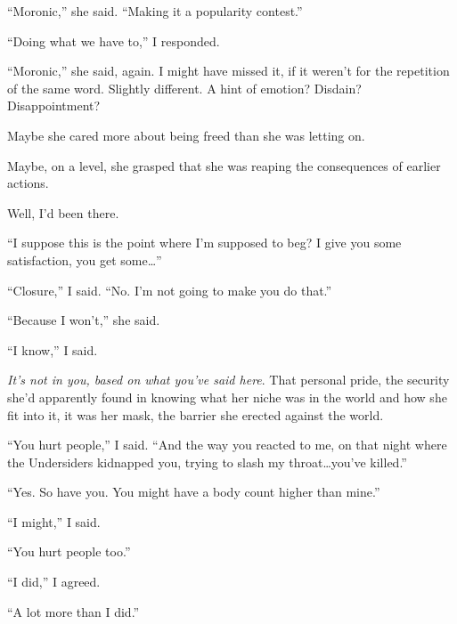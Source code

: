 ``Moronic,'' she said.  ``Making it a popularity contest.''



``Doing what we have to,'' I responded.



``Moronic,'' she said, again.  I might have missed it, if it weren't for the repetition of the same word.  Slightly different.  A hint of emotion?  Disdain?  Disappointment?



Maybe she cared more about being freed than she was letting on.



Maybe, on a level, she grasped that she was reaping the consequences of earlier actions.



Well, I'd been there.



``I suppose this is the point where I'm supposed to beg?  I give you some satisfaction, you get some\ldots''



``Closure,'' I said.  ``No.  I'm not going to make you do that.''



``Because I won't,'' she said.



``I know,'' I said.



\emph{It's not in you, based on what you've said here}.  That personal pride, the security she'd apparently found in knowing what her niche was in the world and how she fit into it, it was her mask, the barrier she erected against the world.



``You hurt people,'' I said.  ``And the way you reacted to me, on that night where the Undersiders kidnapped you, trying to slash my throat\ldots you've killed.''



``Yes.  So have you.  You might have a body count higher than mine.''



``I might,'' I said.



``You hurt people too.''



``I did,'' I agreed.



``A lot more than I did.''



